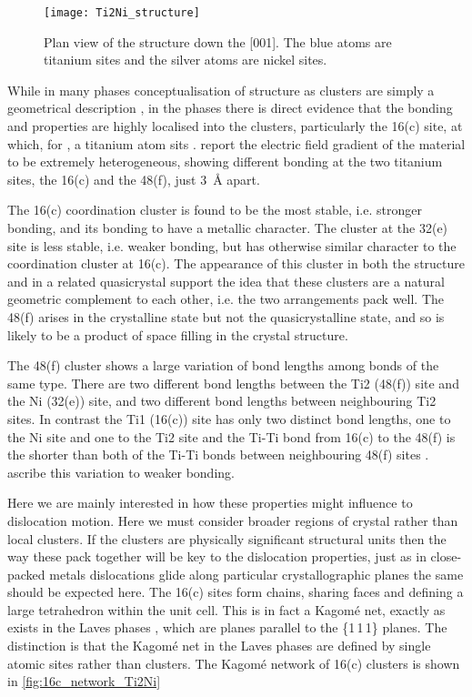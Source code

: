 \begin{figure}
\centering
\texttt{[image: Ti2Ni\_structure]}
\captionsetup{width=0.6\textwidth}
\caption[Plan view of the  structure.]{Plan view of the  structure down the [001]. The blue atoms are titanium sites and the silver atoms are nickel sites.\label{fig:Ti2Ni_plan}}
\end{figure}



While in many phases conceptualisation of structure as clusters are simply a geometrical description \cite{Steurer2006}, in the  phases there is direct evidence that the bonding and properties are highly localised into the clusters, particularly the 16(c) site, at which, for , a titanium atom sits \cite{Ivanovic2006}. \citet{Ivanovic2006} report the electric field gradient of the material to be extremely heterogeneous, showing different bonding at the two titanium sites, the 16(c) and the 48(f), just \SI{3}{\angstrom} apart. 

The 16(c) coordination cluster is found to be the most stable, i.e. stronger bonding, and its bonding to have a metallic character. The cluster at the 32(e) site is less stable, i.e. weaker bonding, but has otherwise similar character to the coordination cluster at 16(c). The appearance of this cluster in both the  structure and in a related quasicrystal support the idea that these clusters are a natural geometric complement to each other, i.e. the two arrangements pack well. The 48(f) arises in the crystalline state but not the quasicrystalline state, and so is likely to be a product of space filling in the  crystal structure. 

The 48(f) cluster shows a large variation of bond lengths among bonds of the same type. There are two different bond lengths between the  Ti2 (48(f)) site and the Ni (32(e)) site, and two different bond lengths between neighbouring Ti2 sites. In contrast the Ti1 (16(c)) site has only two distinct bond lengths, one to the Ni site and one to the Ti2 site and the Ti-Ti bond from 16(c) to the 48(f) is the shorter than both of the Ti-Ti bonds between neighbouring 48(f) sites \cite{Yurko1959,Yurko1962,Ivanovic2006}.  \citet{Ivanovic2006} ascribe this variation to weaker bonding.


Here we are mainly interested in how these properties might influence to dislocation motion. Here we must consider broader regions of crystal rather than local clusters. If the clusters are physically significant structural units then the way these pack together will be key to the dislocation properties, just as in close-packed metals dislocations glide along particular crystallographic planes the same should be expected here. The 16(c) sites form chains, sharing faces and defining a large tetrahedron within the unit cell. This is in fact a Kagom\'{e} net, exactly as exists in the Laves phases \cite{Stein2004,Stein2005}, which are planes parallel to the \{1\,1\,1\} planes. The distinction is that the Kagom\'{e} net in the Laves phases are defined by single atomic sites rather than clusters. The Kagom\'{e} network of 16(c) clusters is shown in \autoref{fig:16c_network_Ti2Ni}

